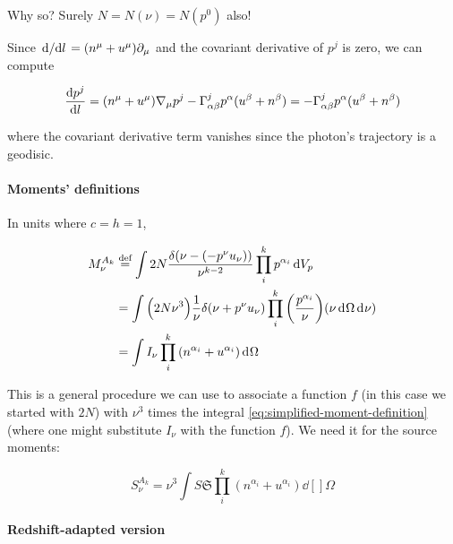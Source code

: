\documentclass[main.tex]{subfiles}
\begin{document}
\begin{greenbox}
  Why so? Surely \(N = N(\nu) = N(p^0)\) also!
\end{greenbox}

Since \(\dv*{}{l} = (n^\mu + u^\mu) \partial_\mu\) and the covariant derivative of \(p^j\) is zero, we can compute

\begin{equation}
  \dv{p^j}{l} = (n^\mu + u^\mu ) \nabla_\mu p^j - \Gamma ^j _{\alpha \beta} p^\alpha (u^\beta + n^\beta)
  = - \Gamma ^j _{\alpha \beta} p^\alpha (u^\beta + n^\beta)
\end{equation}

where the covariant derivative term vanishes since the photon's trajectory is a geodisic.

\paragraph{Moments' definitions}

In units where \(c=h=1\),

\begin{subequations}
\begin{align}
   M _\nu ^{A_k}
   &\defeq \int 2N \frac{\delta (\nu - (-p^\nu u_\nu))}{\nu^{k-2}} \prod_i^k p^{\alpha_i} \dd{V_p} \\
   &= \int \qty(2N \nu^3) \frac{1}{\nu} \delta (\nu +p^\nu u_\nu) \prod_i^k \qty(\frac{p^{\alpha_i}}{\nu}) \qty(\nu \dd[]{\Omega} \dd[]{\nu})  \\
   &= \int  I_\nu \prod_i^k \qty(n^{\alpha_i} + u^{\alpha_i}) \dd[]{\Omega} \label{eq:simplified-moment-definition}
\end{align}
\end{subequations}

This is a general procedure we can use to associate a function \(f\) (in this case we started with \(2N\)) with \(\nu^3\) times the integral \eqref{eq:simplified-moment-definition} (where one might substitute \(I _\nu\) with the function \(f\)).
We need it for the source moments:

\begin{equation}
   S_\nu ^{A_k} = \nu^3 \int S \mathfrak S \prod_i^k (n^{\alpha_i} + u^{\alpha_i}) \dd[]{\Omega}
\end{equation}

\paragraph{Redshift-adapted version}
\end{document}

